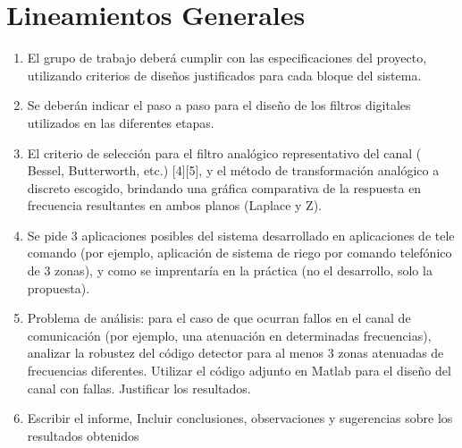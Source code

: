 \section{Lineamientos Generales}
\begin{enumerate}[label=\alph*)]
  \item El grupo de trabajo deberá cumplir con las especificaciones del proyecto,
        utilizando criterios de diseños justificados para cada bloque del sistema.
  \item Se deberán indicar el paso a paso para el diseño de los filtros digitales utilizados
        en las diferentes etapas.
  \item El criterio de selección para el filtro analógico representativo del canal ( Bessel,
        Butterworth, etc.) [4][5], y el método de transformación analógico a discreto escogido,
        brindando una gráfica comparativa de la respuesta en frecuencia resultantes en ambos
        planos (Laplace y Z).
  \item Se pide 3 aplicaciones posibles del sistema desarrollado en aplicaciones de tele
        comando (por ejemplo, aplicación de sistema de riego por comando telefónico de
        3 zonas), y como se imprentaría en la práctica (no el desarrollo, solo la propuesta).
  \item Problema de análisis: para el caso de que ocurran fallos en el canal de comunicación
        (por ejemplo, una atenuación en determinadas frecuencias), analizar la robustez del
        código detector para al menos 3 zonas atenuadas de frecuencias diferentes. Utilizar
        el código adjunto en Matlab para el diseño del canal con fallas. Justificar los
        resultados.
  \item Escribir el informe, Incluir conclusiones, observaciones y sugerencias sobre los
        resultados obtenidos
\end{enumerate}
